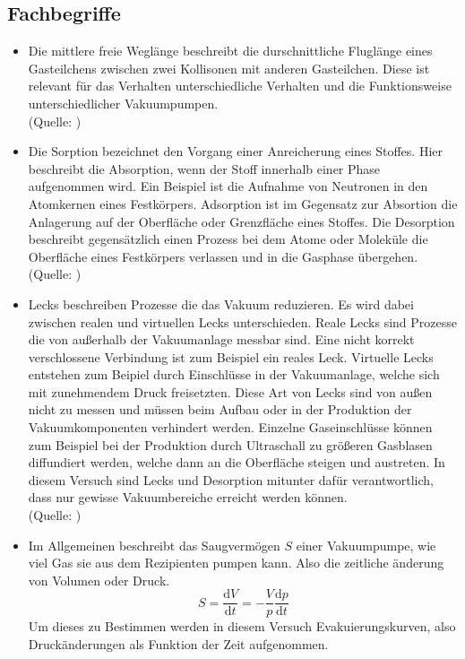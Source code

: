 	\subsection{Fachbegriffe}
	
		\begin{itemize}
			\item
			Die mittlere freie Weglänge beschreibt die durschnittliche Fluglänge eines Gasteilchens zwischen zwei Kollisonen mit anderen Gasteilchen.
			Diese ist relevant für das Verhalten unterschiedliche Verhalten und die Funktionsweise unterschiedlicher Vakuumpumpen.\\
			(Quelle: \cite{wiki:mfg})

			\item
			Die Sorption bezeichnet den Vorgang einer Anreicherung eines Stoffes. 
			Hier beschreibt die Absorption, wenn der Stoff innerhalb einer Phase aufgenommen wird. 
			Ein Beispiel ist die Aufnahme von Neutronen in den Atomkernen eines Festkörpers.
			Adsorption ist im Gegensatz zur Absortion die Anlagerung auf der Oberfläche oder Grenzfläche eines Stoffes.
			Die Desorption beschreibt gegensätzlich einen Prozess bei dem Atome oder Moleküle die Oberfläche eines Festkörpers verlassen und in die Gasphase übergehen.\\
			(Quelle: \cite{wiki:sorp})
			
			\item
			Lecks beschreiben Prozesse die das Vakuum reduzieren. Es wird dabei zwischen realen und virtuellen Lecks unterschieden.
			Reale Lecks sind Prozesse die von außerhalb der Vakuumanlage messbar sind. Eine nicht korrekt verschlossene Verbindung ist zum Beispiel ein reales Leck.
			Virtuelle Lecks entstehen zum Beipiel durch Einschlüsse in der Vakuumanlage, welche sich mit zunehmendem Druck freisetzten.
			Diese Art von Lecks sind von außen nicht zu messen und müssen beim Aufbau oder in der Produktion der Vakuumkomponenten verhindert werden.
			Einzelne Gaseinschlüsse können zum Beispiel bei der Produktion durch Ultraschall zu größeren Gasblasen diffundiert werden, welche dann an die Oberfläche steigen und austreten.
			In diesem Versuch sind Lecks und Desorption mitunter dafür verantwortlich, dass nur gewisse Vakuumbereiche erreicht werden können. \\
			(Quelle: \cite{pfeiffer:grund})

			\item
			Im Allgemeinen beschreibt das Saugvermögen $S$ einer Vakuumpumpe, wie viel Gas sie aus dem Rezipienten pumpen kann. 
			Also die zeitliche änderung von Volumen oder Druck.
			\begin{equation}
				S = \frac{\text{d}V}{\text{d}t} = - \frac{V}{p} \frac{\text{d}p}{\text{d}t}
			\end{equation}
			Um dieses zu Bestimmen werden in diesem Versuch Evakuierungskurven, also Druckänderungen als Funktion der Zeit aufgenommen.
		\end{itemize}

